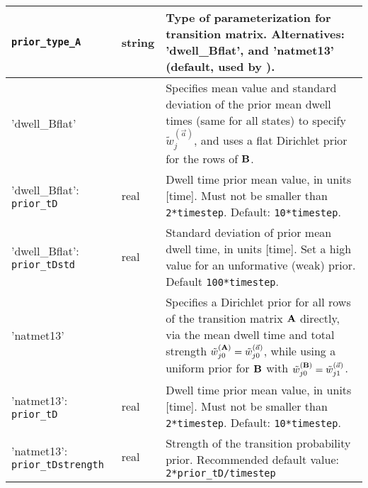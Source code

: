 \begin{longtable}{|m{}|>{\centering\arraybackslash}m{}|m{}|}
\hline\hline

\texttt{prior\_type\_A}& string & Type of parameterization for
transition matrix. Alternatives: 'dwell\_Bflat', and 'natmet13'
(default, used by \citet{Persson2013}).\\ [0.5 ex] \hline

'dwell\_Bflat' & & Specifies mean value and standard deviation of the
prior mean dwell times (same for all states) to specify $\tilde
w_j^{(\vec{a})}$, and uses a flat Dirichlet prior for the rows of
$\mathbf{B}$. \\ [0.5ex] \hline

'dwell\_Bflat': \texttt{prior\_tD} & real & Dwell time
prior mean value, in units [time]. Must not be smaller than
\texttt{2*timestep}. Default: \texttt{10*timestep}. \\ [0.5ex] \hline

'dwell\_Bflat': \texttt{prior\_tDstd} & real& Standard deviation of
prior mean dwell time, in units [time]. Set a high value for an
unformative (weak) prior. Default \texttt{100*timestep}.
\\ [0.5ex] \hline

'natmet13' & & Specifies a Dirichlet prior for all rows of the
transition matrix $\mathbf{A}$ directly, via the mean dwell time and
total strength $\tilde w_{j0}^{(\mathbf{A})}=\tilde
w_{j0}^{(\vec{a})}$, while using a uniform prior for $\mathbf{B}$ with
$\tilde w_{j0}^{(\mathbf{B})}=\tilde w_{j1}^{(\vec{a})}$.  \\ [0.5ex]
\hline


'natmet13': \texttt{prior\_tD} & real & Dwell time
prior mean value, in units [time]. Must not be smaller than
\texttt{2*timestep}. Default: \texttt{10*timestep}. \\ [0.5ex] \hline

'natmet13': \texttt{prior\_tDstrength} & real & Strength of the transition
probability prior. Recommended default value:
\texttt{2*prior\_tD/timestep}\\ [1ex] %
\end{longtable}

\newpage

